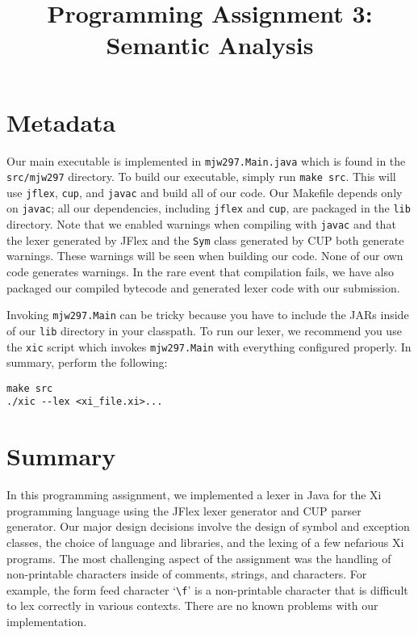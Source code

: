 \documentclass{hw}
\title{Programming Assignment 3:\\ Semantic Analysis}
\begin{document}
\maketitle

\section{Metadata}\label{sec:metadata}
Our main executable is implemented in \texttt{mjw297.Main.java} which is found
in the \texttt{src/mjw297} directory. To build our executable, simply run
\texttt{make src}. This will use \texttt{jflex}, \texttt{cup}, and
\texttt{javac} and build all of our code. Our Makefile depends only on
\texttt{javac}; all our dependencies, including \texttt{jflex} and
\texttt{cup}, are packaged in the \texttt{lib} directory.  Note that we enabled
warnings when compiling with \texttt{javac} and that the lexer generated by
JFlex and the \texttt{Sym} class generated by CUP both generate warnings. These
warnings will be seen when building our code.  None of our own code generates
warnings. In the rare event that compilation fails, we have also packaged our
compiled bytecode and generated lexer code with our submission.

Invoking \texttt{mjw297.Main} can be tricky because you have to include the
JARs inside of our \texttt{lib} directory in your classpath. To run our lexer,
we recommend you use the \texttt{xic} script which invokes \texttt{mjw297.Main}
with everything configured properly. In summary, perform the following:

\begin{center}
\begin{BVerbatim}
make src
./xic --lex <xi_file.xi>...
\end{BVerbatim}
\end{center}

\section{Summary}\label{sec:summary}
In this programming assignment, we implemented a lexer in Java for the Xi
programming language using the JFlex lexer generator and CUP parser generator.
Our major design decisions involve the design of symbol and exception classes,
the choice of language and libraries, and the lexing of a few nefarious Xi
programs. The most challenging aspect of the assignment was the handling of
non-printable characters inside of comments, strings, and characters. For
example, the form feed character `\verb$\f$' is a non-printable character that
is difficult to lex correctly in various contexts. There are no known problems
with our implementation.
\end{document}
